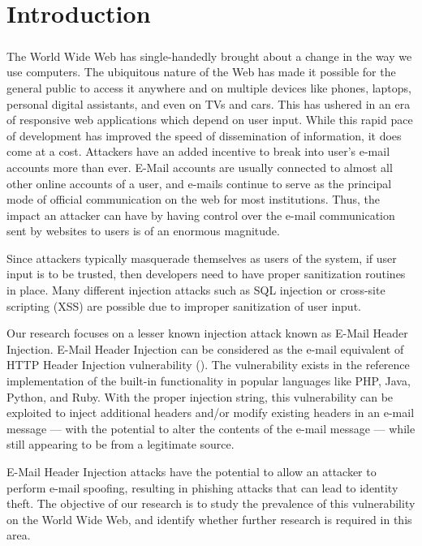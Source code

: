 \chapter{Introduction}
\paragraph{}
	The World Wide Web has single-handedly brought about a change in the way we use computers. The ubiquitous nature of the Web has made it possible for the general public to access it anywhere and on multiple devices like phones, laptops, personal digital assistants, and even on TVs and cars. This has ushered in an era of responsive web applications which depend on user input. While this rapid pace of development has improved the speed of dissemination of information, it does come at a cost. Attackers have an added incentive to break into user's e-mail accounts more than ever. E-Mail accounts are usually connected to almost all other online accounts of a user, and e-mails continue to serve as the principal mode of official communication on the web for most institutions. Thus, the impact an attacker can have by having control over the e-mail communication sent by websites to users is of an enormous magnitude. 
	
	Since attackers typically masquerade themselves as users of the system, if user input is to be trusted, then developers need to have proper sanitization routines in place. Many different injection attacks such as SQL injection or cross-site scripting (XSS) \cite{OWASPT10} are possible due to improper sanitization of user input. 
	
	Our research focuses on a lesser known injection attack known as E-Mail Header Injection. E-Mail Header Injection can be considered as the e-mail equivalent of HTTP Header Injection vulnerability (\cite{wiki:HTTP_headerinjection}). The vulnerability exists in the reference implementation of the built-in  functionality in popular languages like PHP, Java, Python, and Ruby. With the proper injection string, this vulnerability can be exploited to inject additional headers and/or modify existing headers in an e-mail message --- with the potential to alter the contents of the e-mail message --- while still appearing to be from a legitimate source.
	
	E-Mail Header Injection attacks have the potential to allow an attacker to perform e-mail spoofing, resulting in phishing attacks that can lead to identity theft.
	The objective of our research is to study the prevalence of this vulnerability on the World Wide Web, and identify whether further research is required in this area.
	
